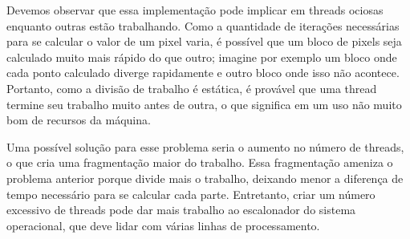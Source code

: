 \documentclass[12pt]{article}
\begin{document}
Devemos observar que essa implementação pode implicar em threads ociosas
enquanto outras estão trabalhando. Como a quantidade de iterações
necessárias para se calcular o valor de um pixel varia, é possível que
um bloco de pixels seja calculado muito mais rápido do que outro; 
imagine por exemplo um bloco onde cada ponto calculado diverge 
rapidamente e outro bloco onde isso não acontece. Portanto, como a 
divisão de trabalho é estática, é provável que uma thread termine seu
trabalho muito antes de outra, o que significa em um uso não muito bom
de recursos da máquina.

Uma possível solução para esse problema seria o aumento no número de 
threads, o que cria uma fragmentação maior do trabalho. Essa 
fragmentação ameniza o problema anterior porque divide mais o trabalho,
deixando menor a diferença de tempo necessário para se calcular cada 
parte. Entretanto, criar um número excessivo de threads pode dar mais
trabalho ao escalonador do sistema operacional, que deve lidar com 
várias linhas de processamento.
\end{document}
